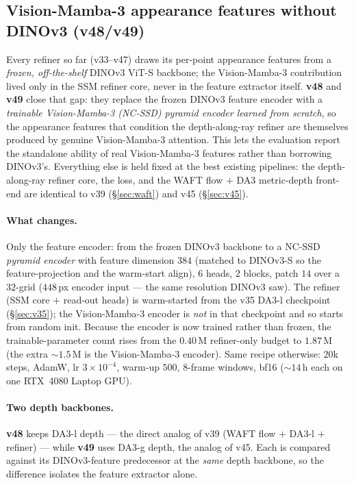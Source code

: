\documentclass[11pt,a4paper]{article}
\begin{document}
\subsection{Vision-Mamba-3 appearance features without DINOv3 (v48/v49)}
\label{sec:v4849}
Every refiner so far (v33--v47) draws its per-point appearance features from a \emph{frozen, off-the-shelf}
DINOv3 ViT-S backbone; the Vision-Mamba-3 contribution lived only in the SSM refiner core, never in the
feature extractor itself. \textbf{v48} and \textbf{v49} close that gap: they replace the frozen DINOv3
feature encoder with a \emph{trainable Vision-Mamba-3 (NC-SSD) pyramid encoder learned from scratch}, so the
appearance features that condition the depth-along-ray refiner are themselves produced by genuine
Vision-Mamba-3 attention. This lets the evaluation report the standalone ability of real Vision-Mamba-3
features rather than borrowing DINOv3's. Everything else is held fixed at the best existing pipelines: the
depth-along-ray refiner core, the loss, and the WAFT flow $+$ DA3 metric-depth front-end are identical to
v39 (\S\ref{sec:waft}) and v45 (\S\ref{sec:v45}).

\paragraph{What changes.} Only the feature encoder: from the frozen DINOv3 backbone to a NC-SSD
\emph{pyramid encoder} with feature dimension $384$ (matched to DINOv3-S so the feature-projection and the
warm-start align), $6$ heads, $2$ blocks, patch $14$ over a $32$-grid ($448$\,px encoder input --- the same
resolution DINOv3 saw). The refiner (SSM core $+$ read-out heads) is warm-started from the v35 DA3-l
checkpoint (\S\ref{sec:v35}); the Vision-Mamba-3 encoder is \emph{not} in that checkpoint and so starts from
random init. Because the encoder is now trained rather than frozen, the trainable-parameter count rises from
the $0.40$\,M refiner-only budget to $1.87$\,M (the extra ${\sim}1.5$\,M is the Vision-Mamba-3 encoder).
Same recipe otherwise: $20$k steps, AdamW, lr $3\!\times\!10^{-4}$, warm-up $500$, $8$-frame windows, bf16
($\sim$$14$\,h each on one RTX~4080 Laptop GPU).

\paragraph{Two depth backbones.} \textbf{v48} keeps DA3-l depth --- the direct analog of v39 (WAFT flow $+$
DA3-l $+$ refiner) --- while \textbf{v49} uses DA3-g depth, the analog of v45. Each is compared against its
DINOv3-feature predecessor at the \emph{same} depth backbone, so the difference isolates the feature
extractor alone.
\end{document}
